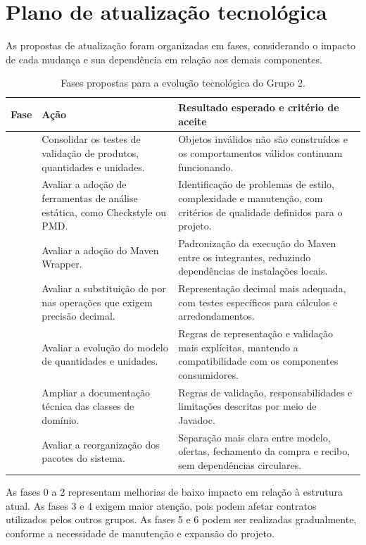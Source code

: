 \section{Plano de atualização tecnológica}

As propostas de atualização foram organizadas em fases, considerando o impacto de cada mudança e sua dependência em relação aos demais componentes.

\begin{table}[H]\centering\small
\begin{tabularx}{\textwidth}{>{\raggedright\arraybackslash}p{1.4cm}>{\raggedright\arraybackslash}p{4.4cm}Y}
\toprule
\textbf{Fase} & \textbf{Ação} & \textbf{Resultado esperado e critério de aceite} \\
 & Consolidar os testes de validação de produtos, quantidades e unidades. & Objetos inválidos não são construídos e os comportamentos válidos continuam funcionando. \\
 & Avaliar a adoção de ferramentas de análise estática, como Checkstyle ou PMD. & Identificação de problemas de estilo, complexidade e manutenção, com critérios de qualidade definidos para o projeto. \\
 & Avaliar a adoção do Maven Wrapper. & Padronização da execução do Maven entre os integrantes, reduzindo dependências de instalações locais. \\
 & Avaliar a substituição de  por  nas operações que exigem precisão decimal. & Representação decimal mais adequada, com testes específicos para cálculos e arredondamentos. \\
 & Avaliar a evolução do modelo de quantidades e unidades. & Regras de representação e validação mais explícitas, mantendo a compatibilidade com os componentes consumidores. \\
 & Ampliar a documentação técnica das classes de domínio. & Regras de validação, responsabilidades e limitações descritas por meio de Javadoc. \\
 & Avaliar a reorganização dos pacotes do sistema. & Separação mais clara entre modelo, ofertas, fechamento da compra e recibo, sem dependências circulares. \\
\bottomrule
\end{tabularx}
\caption{Fases propostas para a evolução tecnológica do Grupo 2.}
\end{table}

As fases 0 a 2 representam melhorias de baixo impacto em relação à estrutura atual. As fases 3 e 4 exigem maior atenção, pois podem afetar contratos utilizados pelos outros grupos. As fases 5 e 6 podem ser realizadas gradualmente, conforme a necessidade de manutenção e expansão do projeto.

